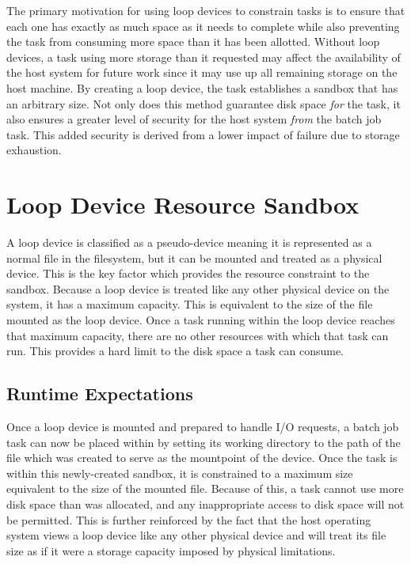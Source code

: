 \documentclass[conference]{IEEEtran}
\begin{document}
The primary motivation for using loop devices to constrain tasks is to ensure that each one has exactly as much space as it needs to complete while also preventing the task from consuming more space than it has been allotted. Without loop devices, a task using more storage than it requested may affect the availability of the host system for future work since it may use up all remaining storage on the host machine. By creating a loop device, the task establishes a sandbox that has an arbitrary size. Not only does this method guarantee disk space {\it{for}} the task, it also ensures a greater level of security for the host system {\it{from}} the batch job task. This added security is derived from a lower impact of failure due to storage exhaustion. 

\section{Loop Device Resource Sandbox}
A loop device is classified as a pseudo-device meaning it is represented as a normal file in the filesystem, but it can be mounted and treated as a physical device. This is the key factor which provides the resource constraint to the sandbox. Because a loop device is treated like any other physical device on the system, it has a maximum capacity. This is equivalent to the size of the file mounted as the loop device. Once a task running within the loop device reaches that maximum capacity, there are no other resources with which that task can run. This provides a hard limit to the disk space a task can consume.

\subsection{Runtime Expectations}
Once a loop device is mounted and prepared to handle I/O requests, a batch job task can now be placed within by setting its working directory to the path of the file which was created to serve as the mountpoint of the device. Once the task is within this newly-created sandbox, it is constrained to a maximum size equivalent to the size of the mounted file. Because of this, a task cannot use more disk space than was allocated, and any inappropriate access to disk space will not be permitted. This is further reinforced by the fact that the host operating system views a loop device like any other physical device and will treat its file size as if it were a storage capacity imposed by physical limitations.
\end{document}
